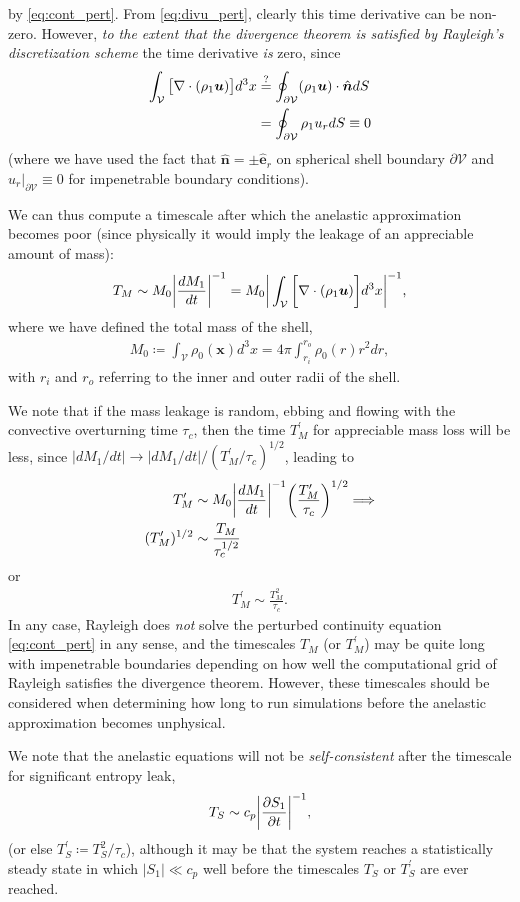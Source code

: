 \documentclass[12pt]{article} %
\newcommand{\pderiv}[2]{\frac{\partial#1}{\partial#2}}
\begin{document}
	by \eqref{eq:cont_pert}. From \eqref{eq:divu_pert}, clearly this time derivative can be non-zero. However, \textit{to the extent that the divergence theorem is satisfied by Rayleigh's discretization scheme} the time derivative \textit{is} zero, since
	\begin{align}
	\int_\mathcal{V} \big{[}\nabla\cdot(\rho_1\bm{u})\big{]}d^3x&\stackrel{?}{=}
	\oint_\mathcal{\partial\mathcal{V}}(\rho_1\bm{u})\cdot\hat{\bm{n}}dS\nonumber\\
	&=\oint_\mathcal{\partial\mathcal{V}}\rho_1u_rdS\equiv 0
	\end{align}
	(where we have used the fact that $\hat{\bm{n}}=\pm\hat{\bm{e}}_r$ on spherical shell boundary $\partial\mathcal{V}$ and $u_r|_{\partial\mathcal{V}}\equiv0$ for impenetrable boundary conditions). 
	
	We can thus compute a timescale after which the anelastic approximation becomes poor (since physically it would imply the leakage of an appreciable amount of mass):
	\begin{align}
	T_M \sim M_0 \bigg{|}\frac{dM_1}{dt}\bigg{|}^{-1} = 
	M_0 \bigg{|}\int_\mathcal{V}\bigg{[}\nabla\cdot(\rho_1\bm{u})\bigg{]}d^3x\bigg{|}^{-1},
	\end{align}
	where we have defined the total mass of the shell,
	\begin{align}
	M_0\coloneqq \int_{\mathcal{V}}\rho_0(\bm{x})d^3x = 4\pi\int_{r_i}^{r_o}\rho_0(r)r^2dr,
	\end{align}
	with $r_i$ and $r_o$ referring to the inner and outer radii of the shell. 
	
	We note that if the mass leakage is random, ebbing and flowing with the convective overturning time $\tau_c$, then the time $T_M^\prime$ for appreciable mass loss will be less, since $|dM_1/dt|\rightarrow |dM_1/dt|/(T_M^\prime/\tau_c)^{1/2}$, leading to 
	\begin{align}
	T_M^\prime &\sim M_0 \bigg{|}\frac{dM_1}{dt}\bigg{|}^{-1}\bigg{(}\frac{T_M^\prime}{\tau_c}\bigg{)}^{1/2}\Longrightarrow\nonumber\\
	(T^\prime_M)^{1/2}&\sim \frac{T_M}{\tau_c^{1/2}}
	\end{align}
	or
	\begin{align}
	T^\prime_M\sim\frac{T_M^2}{\tau_c}.
	\end{align}
	In any case, Rayleigh does \textit{not} solve the perturbed continuity equation \eqref{eq:cont_pert} in any sense, and the timescales $T_M$ (or $T^\prime_M$) may be quite long with impenetrable boundaries depending on how well the computational grid of Rayleigh satisfies the divergence theorem. However, these timescales should be considered when determining how long to run simulations before the anelastic approximation becomes unphysical. 
	
	We note that the anelastic equations will not be \textit{self-consistent} after the timescale for significant entropy leak,
	\begin{align}
	T_S \sim c_p\bigg{|}\pderiv{S_1}{t}\bigg{|}^{-1},
	\end{align}
	(or else $T_S^\prime\coloneqq T_S^2/\tau_c$), although it may be that the system reaches a statistically steady state in which $|S_1|\ll c_p$ well before the timescales $T_S$ or $T_S^\prime$ are ever reached. 
\end{document}
